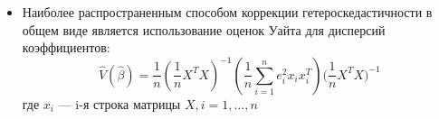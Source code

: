 \documentclass[a0,final]{a0poster}
\begin{document}
\begin{multicols}{4}
\begin{itemize}
\item Наиболее распространенным способом коррекции гетероскедастичности в общем виде является использование оценок Уайта для дисперсий коэффициентов:
\[\hat{V}(\hat{\beta}) = \frac{1}{n}(\frac{1}{n} {X^TX})^{-1} (\frac{1}{n} \sum\limits_{i=1}^n{e_i^2 x_i x_i^T}) {(\frac{1}{n} X^TX})^{-1} \]
где $x_i$ — i-я строка матрицы $X, i=1, \ldots,n$


\end{itemize}
\end{multicols}
\end{document}
